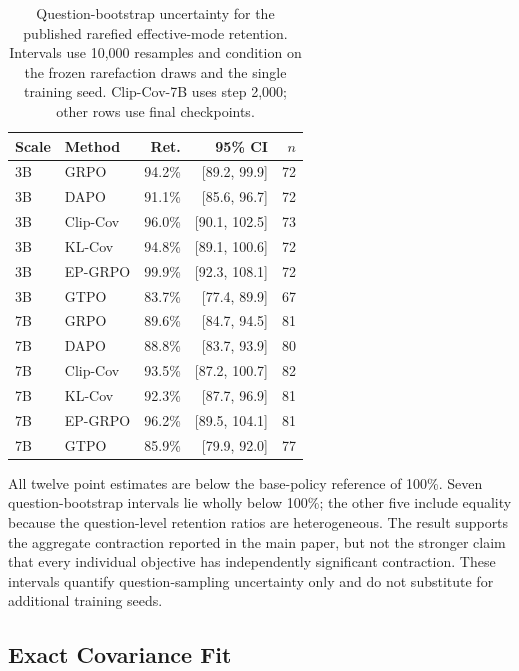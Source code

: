 \documentclass[letterpaper]{article}
\begin{document}
\begin{table}[t]
\centering
\scriptsize
\setlength{\tabcolsep}{3pt}
\begin{tabular*}{\columnwidth}{@{\extracolsep{\fill}}llrrr@{}}
\toprule
Scale & Method & Ret. & 95\% CI & \(n\)\\
\midrule
3B & GRPO     & 94.2\% & [89.2, 99.9] & 72\\
3B & DAPO     & 91.1\% & [85.6, 96.7] & 72\\
3B & Clip-Cov & 96.0\% & [90.1, 102.5] & 73\\
3B & KL-Cov   & 94.8\% & [89.1, 100.6] & 72\\
3B & EP-GRPO  & 99.9\% & [92.3, 108.1] & 72\\
3B & GTPO     & 83.7\% & [77.4, 89.9] & 67\\
\midrule
7B & GRPO     & 89.6\% & [84.7, 94.5] & 81\\
7B & DAPO     & 88.8\% & [83.7, 93.9] & 80\\
7B & Clip-Cov & 93.5\% & [87.2, 100.7] & 82\\
7B & KL-Cov   & 92.3\% & [87.7, 96.9] & 81\\
7B & EP-GRPO  & 96.2\% & [89.5, 104.1] & 81\\
7B & GTPO     & 85.9\% & [79.9, 92.0] & 77\\
\bottomrule
\end{tabular*}
\caption{Question-bootstrap uncertainty for the published rarefied
effective-mode retention.  Intervals use 10,000 resamples and condition on
the frozen rarefaction draws and the single training seed.  Clip-Cov-7B uses
step 2,000; other rows use final checkpoints.}
\label{tab:sup-mode-bootstrap}
\end{table}

All twelve point estimates are below the base-policy reference of 100\%.
Seven question-bootstrap intervals lie wholly below 100\%; the other five
include equality because the question-level retention ratios are
heterogeneous.  The result supports the aggregate contraction reported in
the main paper, but not the stronger claim that every individual objective
has independently significant contraction.  These intervals quantify
question-sampling uncertainty only and do not substitute for additional
training seeds.

\subsection{Exact Covariance Fit}
\end{document}
